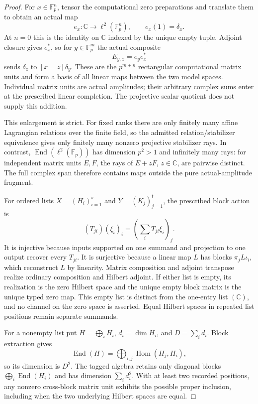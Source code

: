 \begin{proof}
For $x\in\mathbb F_p^n$, tensor the computational zero preparations and
translate them to obtain an actual map
\[
 e_x:\mathbb C\longrightarrow\ell^2(\mathbb F_p^n),
 \qquad e_x(1)=\delta_x.
\]
At $n=0$ this is the identity on $\mathbb C$ indexed by the unique empty
tuple.  Adjoint closure gives $e_x^*$, so for
$y\in\mathbb F_p^m$ the actual composite
\[
 E_{y,x}=e_y e_x^*
\]
sends $\delta_z$ to $[x=z]\delta_y$.  These are the
$p^{m+n}$ rectangular computational matrix units and form a basis of all
linear maps between the two model spaces.  Individual matrix units are
actual amplitudes; their arbitrary complex sums enter at the prescribed
linear completion.  The projective scalar quotient does not supply this
addition.

This enlargement is strict.  For fixed ranks there are only finitely many
affine Lagrangian relations over the finite field, so the admitted
relation/stabilizer equivalence gives only finitely many nonzero projective
stabilizer rays.  In contrast, $\operatorname{End}(\ell^2(\mathbb F_p))$
has dimension $p^2>1$ and infinitely many rays: for independent matrix units
$E,F$, the rays of $E+zF$, $z\in\mathbb C$, are pairwise distinct.  The full
complex span therefore contains maps outside the pure actual-amplitude
fragment.

For ordered lists $X=(H_i)_{i=1}^s$ and $Y=(K_j)_{j=1}^t$, the prescribed
block action is
\[
 (T_{ji})(\xi_i)_i=\left(\sum_iT_{ji}\xi_i\right)_j.
\]
It is injective because inputs supported on one summand and projection to one
output recover every $T_{ji}$.  It is surjective because a linear map $L$
has blocks $\pi_jL\iota_i$, which reconstruct $L$ by linearity.  Matrix
composition and adjoint transpose realize ordinary composition and Hilbert
adjoint.  If either list is empty, its realization is the zero Hilbert space
and the unique empty block matrix is the unique typed zero map.  This empty
list is distinct from the one-entry list $(\mathbb C)$, and no channel on the
zero space is asserted.  Equal Hilbert spaces in repeated list positions
remain separate summands.

For a nonempty list put $H=\bigoplus_iH_i$, $d_i=\dim H_i$, and
$D=\sum_i d_i$.  Block extraction gives
\[
 \operatorname{End}(H)=\bigoplus_{i,j}\operatorname{Hom}(H_j,H_i),
\]
so its dimension is $D^2$.  The tagged algebra retains only diagonal blocks
$\bigoplus_i\operatorname{End}(H_i)$ and has dimension
$\sum_i d_i^2$.  With at least two recorded positions, any nonzero
cross-block matrix unit exhibits the possible proper inclusion, including
when the two underlying Hilbert spaces are equal.


\end{proof}
